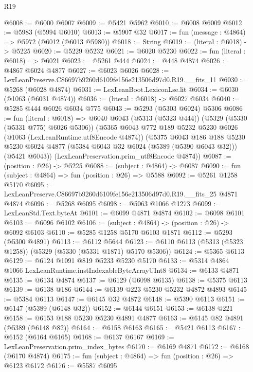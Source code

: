 \begin{lexlean}{R19}
\begin{coremodule}
@6008 := @6000 @6007
@6009 := @5421 @5962
@6010 := @6008 @6009
@6012 := @5983 (@5994 @6010)
@6013 := @5907 @32
@6017 := fun (message : @4864) => @5972 (@6012 (@6013 @5980))
@6018 := String
@6019 := (literal : @6018) -> @5225
@6020 := @5229 @5232
@6021 := @6020 @5230
@6022 := fun (literal : @6018) => @6021
@6023 := @5261 @444
@6024 := @448 @4874
@6026 := @4867 @6024 @4877
@6027 := @6023 @6026
@6028 := LexLeanPreserve.C86697b9260d6109fe156e213506d97d0.R19.__fits_11
@6030 := @5268 (@6028 @4874)
@6031 := LexLeanBoot.LexiconLse.lit
@6034 := @6030 (@1063 (@6031 @4874))
@6036 := (literal : @6018) -> @6027 @6034
@6040 := @5285 @444 @6026 @6034 @775
@6043 := @5293 (@5303 @6024) @5306
@6086 := fun (literal : @6018) =>
  @6040
    @6043
    (@5313 (@5323 @444))
    (@5329 (@5330 (@5331 @775) @6026 @5306))
    (@5365
      @6043
      @772
      @189
      @5232
      @5230
      @6026
      (@1063 (LexLeanRuntime.utf8Encode @4874))
      (@5375
        @6043
        @186
        @188
        @5230
        @5230
        @6024
        @4877
        (@5384 @6043 @32 @6024 (@5389 (@5390 @6043 @32)))
        (@5421 @6043))
      (LexLeanPreservation.prim_utf8Encode @4874))
@6087 := (position : @26) -> @5225
@6088 := (subject : @4864) -> @6087
@6090 := fun (subject : @4864) => fun (position : @26) => @5588
@6092 := @5261 @1258 @5170
@6095 := LexLeanPreserve.C86697b9260d6109fe156e213506d97d0.R19.__fits_25 @4871 @4874
@6096 := @5268 @6095
@6098 := @5063 @1066 @1273
@6099 := LexLeanStd.Text.byteAt
@6101 := @6099 @4871 @4874
@6102 := @6098 @6101
@6103 := @6096 @6102
@6106 := (subject : @4864) -> (position : @26) -> @6092 @6103
@6110 := @5285 @1258 @5170 @6103 @1871
@6112 := @5293 (@5300 @4891)
@6113 := @6112 @5644
@6123 := @6110 @6113 (@5313 (@5323 @1258)) (@5329 (@5330 (@5331 @1871) @5170 @5306))
@6124 := @5365 @6113
@6129 := @6124 @1091 @819 @5233 @5230 @5170
@6133 := @5314 @4864 @1066 LexLeanRuntime.instIndexableByteArrayUInt8
@6134 := @6133 @4871
@6135 := @6134 @4874
@6137 := @6129 (@6098 @6135)
@6138 := @5375 @6113
@6139 := @6138 @186
@6144 := @6139 @223 @5230 @5232 @4872 @4893
@6145 := @5384 @6113
@6147 := @6145 @32 @4872
@6148 := @5390 @6113
@6151 := @6147 (@5389 (@6148 @32))
@6152 := @6144 @6151
@6153 := @6138 @221
@6158 := @6153 @188 @5230 @5230 @4891 @4877
@6163 := @6145 @82 @4891 (@5389 (@6148 @82))
@6164 := @6158 @6163
@6165 := @5421 @6113
@6167 := @6152 (@6164 @6165)
@6168 := @6137 @6167
@6169 := LexLeanPreservation.prim_index_bytes
@6170 := @6169 @4871
@6172 := @6168 (@6170 @4874)
@6175 := fun (subject : @4864) => fun (position : @26) => @6123 @6172
@6176 := @5587 @6095

\end{coremodule}
\end{lexlean}
